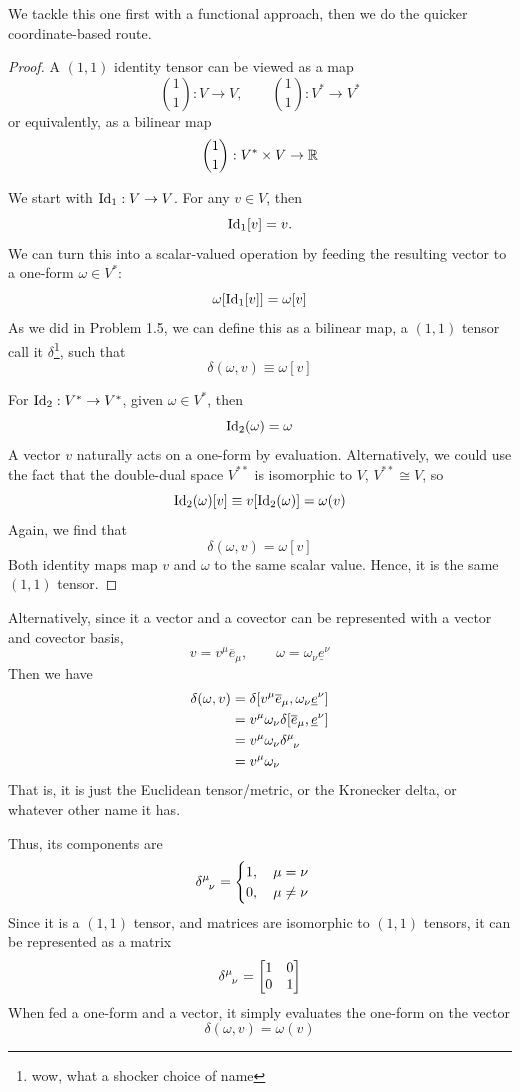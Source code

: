 \documentclass[12pt,a4paper]{article}
\newcommand{\und}[1]{\underline{#1}}
\newcommand{\ovr}[1]{\overline{#1}}
\begin{document}
	\begin{solution_pset}
			We tackle this one first with a functional approach,
			then we do the quicker coordinate-based route.
		\begin{proof}

			A $(1,1)$ identity tensor can be viewed as a map
			\[
				\binom{1}{1}:
				V\to V,\qquad 
				\binom{1}{1}:
				V^* \to V^*
			\]
			or equivalently, as a bilinear map
			\[
				\binom{1}{1}:
				V^*\times V\to \mathbb{R}
			\]

			We start with $\operatorname{Id}_1:V\to V$. 
			For any $v\in V$, then
			\[
				\operatorname{Id}_1[v]= v.
			\]
			We can turn this into a scalar-valued operation
			by feeding the resulting vector to a one-form $\omega\in V^*$:
			\[
				\omega[\operatorname{Id}_1[v]] = \omega[v]
			\]
			As we did in Problem 1.5, we can define this as a bilinear map, a $(1,1)$ tensor
			call it $\delta$\footnote{wow, what a shocker choice of name}, such that
			\[
				\delta(\omega,v) \equiv \omega[v]
			\]

			For $\operatorname{Id}_2:V^*\to V^*$, given $\omega\in V^*$,
			then
			\[
				\operatorname{Id}_2(\omega)= \omega
			\]
			A vector $v$ naturally acts on a one-form by evaluation.
			Alternatively, we could use the fact that the double-dual
			space $V^{**}$ is isomorphic to $V$, $V^{**}\cong V$, so 
			\[
				\operatorname{Id}_2(\omega)[v] \equiv v[\operatorname{Id}_2(\omega)] = \omega(v)
			\]
			Again, we find that
			\[
				\delta(\omega,v)= \omega[v]
			\]
			Both identity maps map $v$ and $\omega$ to the same 
			scalar value. Hence, it is the same $(1,1)$ tensor.
		\end{proof}

		Alternatively, since it a vector and a covector can be represented
		with a vector and covector basis,
		\[
			v = v^\mu \ovr e_\mu,\qquad  \omega = \omega_\nu \und e^\nu
		\]
		Then we have
		\begin{align*}
			\delta(\omega,v) 
			&= 
			\delta[
				v^\mu \ovr e_\mu,
				\omega_\nu \und e^\nu
			]\\
			&=
			v^\mu \omega_\nu \delta[\ovr e_\mu, \und e^\nu]\\
			&=
			v^\mu \omega_\nu \delta\indices{^\mu_\nu}\\
			&=
			v^\mu \omega_\nu
		\end{align*}
		That is, it is just the Euclidean tensor/metric,
		or the Kronecker delta, or whatever other name it has.

		Thus, its components are 
		\[
			\delta\indices{^\mu_\nu} = 
			\begin{cases}
			    1,\quad\mu=\nu\\
				0,\quad\mu\neq\nu
			\end{cases}
		\]
		Since it is a $(1,1)$ tensor, and matrices are isomorphic to $(1,1)$ tensors,
		it can be represented as a matrix
		\[
			\delta\indices{^\mu_\nu}
			=
			\bmqty{
				1 & 0 \\
				0 & 1
			} 
		\]
		When fed a one-form and a vector, it simply evaluates the
		one-form on the vector
		\[
			\delta(\omega,v) = \omega(v)
		\]


\end{solution_pset}
\end{document}
